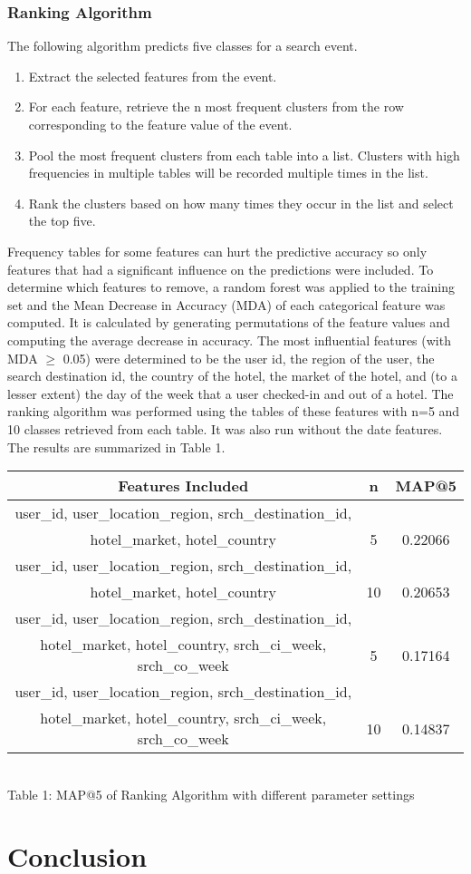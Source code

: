 \documentclass[12pt]{report}
\begin{document}
\subsection{Ranking Algorithm}
The following algorithm predicts five classes for a search event.
\begin{enumerate}
  \item Extract the selected features from the event.
  \item For each feature, retrieve the n most frequent clusters from the row corresponding to the feature value of the event.
  \item Pool the most frequent clusters from each table into a list. Clusters with high frequencies in multiple tables will be recorded multiple times in the list.
  \item Rank the clusters based on how many times they occur in the list and select the top five.
\end{enumerate} 
Frequency tables for some features can hurt the predictive accuracy so only features that had a significant influence on the predictions were included. To determine which features to remove, a random forest was applied to the training set and the Mean Decrease in Accuracy (MDA) of each categorical feature was computed. It is calculated by generating permutations of the feature values and computing the average decrease in accuracy. The most influential features (with MDA $\geq$ 0.05) were determined to be the user id, the region of the user, the search destination id, the country of the hotel, the market of the hotel, and (to a lesser extent) the day of the week that a user checked-in and out of a hotel. The ranking algorithm was performed using the tables of these features with n=5 and 10 classes retrieved from each table. It was also run without the date features. The results are summarized in Table 1.

\begin{center}
	\begin{tabular}{|c|c|c|}
		\hline
		Features Included& n& MAP@5\\
		\hline \hline
		user\_id, user\_location\_region, srch\_destination\_id,\\ hotel\_market, hotel\_country & 5 & 0.22066\\\hline
		user\_id, user\_location\_region, srch\_destination\_id,\\ hotel\_market, hotel\_country  & 10 & 0.20653\\\hline
		user\_id, user\_location\_region, srch\_destination\_id,\\ hotel\_market, hotel\_country, srch\_ci\_week, srch\_co\_week  & 5 & 0.17164\\\hline
		user\_id, user\_location\_region, srch\_destination\_id,\\ hotel\_market, hotel\_country, srch\_ci\_week, srch\_co\_week  & 10 & 0.14837 \\\hline
	\end{tabular}
	\\Table 1: MAP@5 of Ranking Algorithm with different parameter settings
\end{center}

\chapter{Conclusion}
\end{document}

